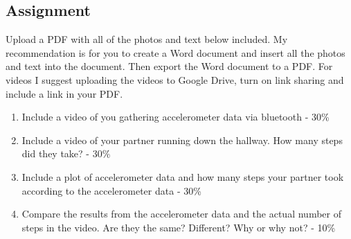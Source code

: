 \subsection{Assignment}

Upload a PDF with all of the photos and text below included. My recommendation is for you to create a Word document and insert all the photos and text into the document. Then export the Word document to a PDF. For videos I suggest uploading the videos to Google Drive, turn on link sharing and include a link in your PDF.

\begin{enumerate}[itemsep=-5pt]
\item Include a video of you gathering accelerometer data via bluetooth - 30\%
\item Include a video of your partner running down the hallway. How many steps did they take? - 30\%
\item Include a plot of accelerometer data and how many steps your partner took according to the accelerometer data - 30\%
\item Compare the results from the accelerometer data and the actual number of steps in the video. Are they the same? Different? Why or why not? - 10\%
\end{enumerate}